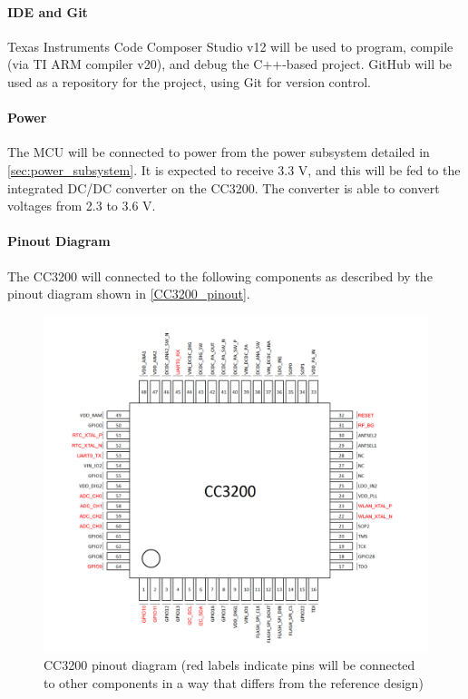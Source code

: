 \paragraph{IDE and Git}
Texas Instruments Code Composer Studio v12 will be used to program,
compile (via TI ARM compiler v20), and debug the C++-based project. GitHub
will be used as a repository for the project, using Git for version
control.

\paragraph{Power}
The MCU will be connected to power from the power subsystem detailed in 
\autoref{sec:power_subsystem}. It is expected to receive 3.3 V, and this will
be fed to the integrated DC/DC converter on the CC3200. The converter is able
to convert voltages from 2.3 to 3.6 V.

\paragraph{Pinout Diagram}
The CC3200 will connected to the following components as described by the
pinout diagram shown in \autoref{CC3200_pinout}.
\begin{figure}[H]
    \caption{CC3200 pinout diagram (red labels indicate pins will be connected to other components in a way that differs from the reference design)}
    \label{CC3200_pinout}
    \centering
    \includegraphics[width=\textwidth]{images/CC3200_pinout.png}
\end{figure}

